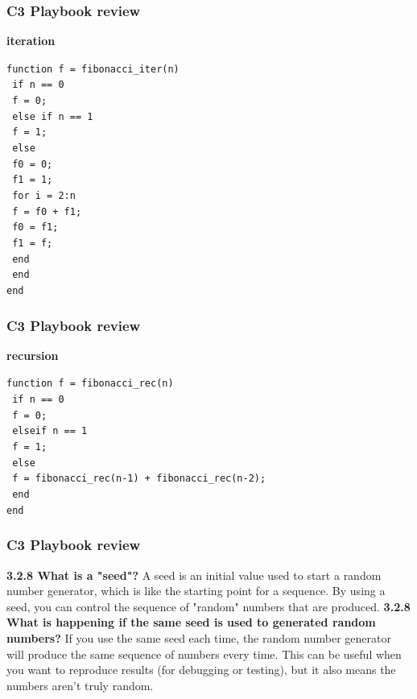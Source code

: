 \documentclass[
	11pt, %
]{beamer}
\begin{document}
\begin{frame}
	\frametitle{C3 Playbook review}

    \textbf{iteration}

\texttt{function f = fibonacci\_iter(n)} \\
\texttt{  \quad  if n == 0} \\
\texttt{    \quad  \quad     f = 0;} \\
\texttt{    \quad else if n == 1} \\
\texttt{    \quad  \quad     f = 1;} \\
\texttt{    \quad else} \\
\texttt{     \quad  \quad    f0 = 0;} \\
\texttt{ \quad  \quad f1 = 1;} \\
\texttt{    \quad  \quad     for i = 2:n} \\
\texttt{      \quad  \quad  \quad       f = f0 + f1;} \\
\texttt{      \quad  \quad  \quad       f0 = f1;} \\
\texttt{  \quad  \quad  \quad       f1 = f;} \\
\texttt{      \quad  \quad   end} \\
\texttt{   \quad  end} \\
\texttt{end} \\
\end{frame}


\begin{frame}
	\frametitle{C3 Playbook review}

    \textbf{recursion}

    \texttt{function f = fibonacci\_rec(n)} \\
    \texttt{  \quad  if n == 0} \\
    \texttt{  \quad  \quad       f = 0;} \\
    \texttt{  \quad   elseif n == 1} \\
    \texttt{   \quad  \quad      f = 1;} \\
    \texttt{  \quad   else} \\
    \texttt{  \quad  \quad       f = fibonacci\_rec(n-1) + fibonacci\_rec(n-2);} \\
    \texttt{  \quad   end} \\
    \texttt{end}
\end{frame}
\begin{frame}
	\frametitle{C3 Playbook review}
    \textbf{3.2.8 What is a "seed"?}
    A seed is an initial value used to start a random number generator, which is like the starting point for a sequence. 
    By using a seed, you can control the sequence of "random" numbers that are produced.
    \textbf{3.2.8 What is happening if the same seed is used to generated random numbers?}
    If you use the same seed each time, the random number generator will produce the same sequence of numbers every time. 
    This can be useful when you want to reproduce results (for debugging or testing), but it also means the numbers aren't truly random. 

\end{frame}
\end{document}
